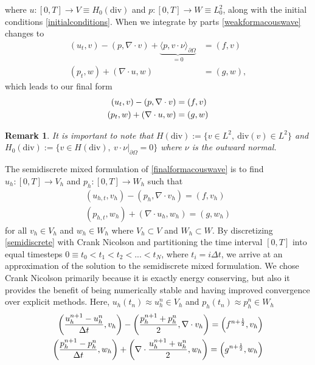\documentclass[11pt]{article}
\newtheorem{remark}{Remark}[section]
\newcommand{\divv}{\mathrm{div}}
\begin{document}
where $u:[0,T] \rightarrow V \equiv H_0(\divv)$ and $p:[0,T] \rightarrow W \equiv L_0^2$, along with the initial conditions \eqref{initialconditions}.
When we integrate by parts \eqref{weakformacouswave} changes to 
\begin{equation}
\begin{split}
(u_t,v) - (p,\nabla \cdot v) + \underbrace{\langle p, v \cdot \nu \rangle_{\partial\Omega}}_{=0} &= (f,v) \\
(p_t, w) + (\nabla \cdot u,w) &= (g,w),
\end{split}
\end{equation}
which leads to our final form 
\begin{equation}{\label{finalformacouswave}}
\begin{split}
(u_t,v) - (p,\nabla \cdot v) &= (f,v)\\
(p_t, w) + (\nabla \cdot u,w) &= (g,w)
\end{split}
\end{equation}
\begin{remark}
	It is important to note that $H(\divv):= \{v \in L^2,\: \divv(v) \in L^2\}$ and $H_0(\divv) := \{ v\in H(\divv),\: v \cdot \nu|_{\partial \Omega} = 0 \}$ where $\nu$ is the outward normal.
\end{remark}
The semidiscrete mixed formulation of \eqref{finalformacouswave} is to find $u_h:[0,T] \rightarrow V_h$ and $p_h:[0,T] \rightarrow W_h$ such that
\begin{equation}\label{semidiscrete}
\begin{split}
(u_{h,t},v_h) - (p_h,\nabla \cdot v_h) = (f,v_h)\\
(p_{h,t}, w_h) + (\nabla \cdot u_h,w_h) = (g,w_h)
\end{split}
\end{equation}
for all $v_h \in V_h$ and $w_h \in W_h$ where $V_h \subset V$ and $W_h \subset W$.
By discretizing \eqref{semidiscrete} with Crank Nicolson and partitioning the time interval $[0,T]$ into equal timesteps $0 \equiv t_0 < t_1 < t_2 < ... < t_N$, where $t_i = i\Delta t$, we arrive at an approximation of the solution to the semidiscrete mixed formulation. We chose Crank Nicolson primarily because it is exactly energy conserving, but also it provides the benefit of being numerically stable and having improved convergence over explicit methods. Here, $u_h(t_n) \approx u^n_h \in V_h$ and $p_h(t_n) \approx p^n_h \in W_h$
\begin{equation}{\label{cnacoustic}}
\begin{split}
\left(\frac{u^{n+1}_h-u^n_h}{\Delta t},v_h\right)-\left(\frac{p^{n+1}_h+p^n_h}{2},\nabla \cdot v_h\right) = \left(f^{n+\frac{1}{2}},v_h\right) \\
\left(\frac{p^{n+1}_h-p^n_h}{\Delta t},w_h\right)+\left(\nabla \cdot \frac{u^{n+1}_h+u^n_h}{2},w_h\right) = \left(g^{n+\frac{1}{2}},w_h\right)
\end{split}
\end{equation}
\end{document}
